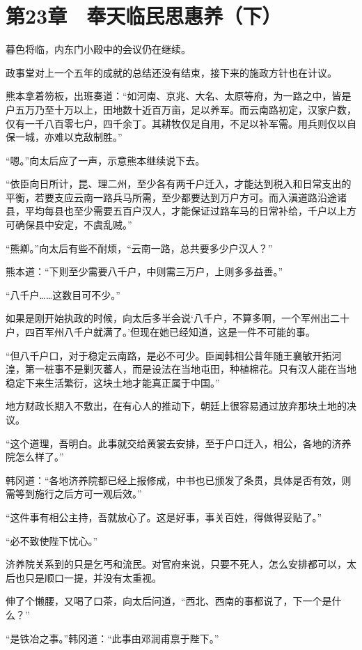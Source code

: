 \section{第23章　奉天临民思惠养（下）}

暮色将临，内东门小殿中的会议仍在继续。

政事堂对上一个五年的成就的总结还没有结束，接下来的施政方针也在计议。

熊本拿着笏板，出班奏道：“如河南、京兆、大名、太原等府，为一路之中，皆是户五万乃至十万以上，田地数十近百万亩，足以养军。而云南路初定，汉家户数，仅有一千八百零七户，四千余丁。其耕牧仅足自用，不足以补军需。用兵则仅以自保一城，亦难以克敌制胜。”

“嗯。”向太后应了一声，示意熊本继续说下去。

“依臣向日所计，昆、理二州，至少各有两千户迁入，才能达到税入和日常支出的平衡，若要支应云南一路兵马所需，至少都要达到万户方可。而入滇道路沿途诸县，平均每县也至少需要五百户汉人，才能保证过路车马的日常补给，千户以上方可确保县中安定，不虞乱贼。”

“熊卿。”向太后有些不耐烦，“云南一路，总共要多少户汉人？”

熊本道：“下则至少需要八千户，中则需三万户，上则多多益善。”

“八千户……这数目可不少。”

如果是刚开始执政的时候，向太后多半会说‘八千户，不算多啊，一个军州出二十户，四百军州八千户就满了。’但现在她已经知道，这是一件不可能的事。

“但八千户口，对于稳定云南路，是必不可少。臣闻韩相公昔年随王襄敏开拓河湟，第一桩事不是剿灭蕃人，而是设法在当地屯田，种植棉花。只有汉人能在当地稳定下来生活繁衍，这块土地才能真正属于中国。”

地方财政长期入不敷出，在有心人的推动下，朝廷上很容易通过放弃那块土地的决议。

“这个道理，吾明白。此事就交给黄裳去安排，至于户口迁入，相公，各地的济养院怎么样了。”

韩冈道：“各地济养院都已经上报修成，中书也已颁发了条贯，具体是否有效，则需等到施行之后方可一观后效。”

“这件事有相公主持，吾就放心了。这是好事，事关百姓，得做得妥贴了。”

“必不致使陛下忧心。”

济养院关系到的只是乞丐和流民。对官府来说，只要不死人，怎么安排都可以，太后也只是顺口一提，并没有太重视。

伸了个懒腰，又喝了口茶，向太后问道，“西北、西南的事都说了，下一个是什么？”

“是铁冶之事。”韩冈道：“此事由邓润甫禀于陛下。”

